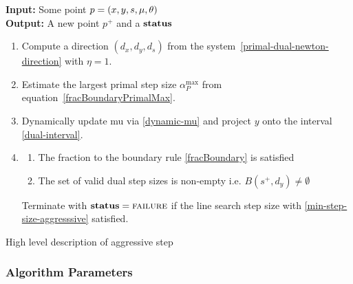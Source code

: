 \documentclass{article}
\begin{document}
\begin{algorithm}[H]
\textbf{Input:} Some point $p = (x, y, s, \mu, \theta)$ \\
\textbf{Output:} A new point $p^{+}$ and a $\textbf{status}$
\begin{enumerate}[label*=A.{\arabic*}]
\item Compute a direction $(d_{x}, d_{y}, d_{s})$ from the system~\eqref{primal-dual-newton-direction} with $\eta = 1$.
\item Estimate the largest primal step size $\alpha^{\max}_{P}$ from equation~\eqref{fracBoundaryPrimalMax}.
\item Dynamically update mu via \eqref{dynamic-mu} and project $y$ onto the interval \eqref{dual-interval}.
\item \label{agg:back-track} \backtrackBlurb
\begin{enumerate}[label=({\roman*})] 
\item The fraction to the boundary rule \eqref{fracBoundary} is satisfied
\item The set of valid dual step sizes is non-empty i.e. $B( s^{+}, d_{y} ) \neq \emptyset$ 
\end{enumerate}
Terminate with $\textbf{status} = \textsc{failure}$ if the line search step size with \eqref{min-step-size-aggresssive} satisfied.
\end{enumerate}
\caption{High level description of aggressive step}\label{alg:aggressive}
\end{algorithm}

\subsubsection{Algorithm Parameters}
\end{document}
